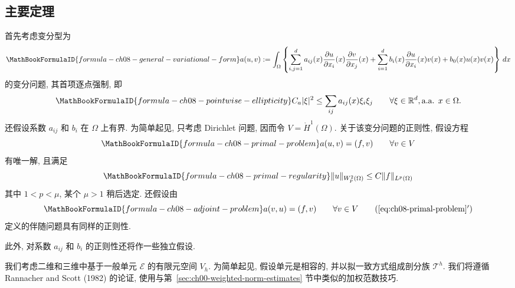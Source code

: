 \subsection{主要定理}
\label{sec:ch08-main-theorem}
\setcounter{thmcount}{0}
\setcounter{equation}{0}

首先考虑变分型为
\[
\MathBookFormulaID{formula-ch08-general-variational-form}
a(u,v):=\int_\Omega\left\{\sum_{i,j=1}^{d}a_{ij}(x)
\frac{\partial u}{\partial x_i}(x)\frac{\partial v}{\partial x_j}(x)
+\sum_{i=1}^{d}b_i(x)\frac{\partial u}{\partial x_i}(x)v(x)+b_0(x)u(x)v(x)\right\}\,dx
\]
的变分问题, 其首项逐点强制, 即
\begin{equation}
\MathBookFormulaID{formula-ch08-pointwise-ellipticity}
\label{eq:ch08-pointwise-ellipticity}
C_a|\xi|^2\leq\sum_{ij}a_{ij}(x)\xi_i\xi_j
\qquad\forall\xi\in\mathbb R^d, \text{a.a. }x\in\Omega.
\end{equation}
还假设系数 $a_{ij}$ 和 $b_i$ 在 $\Omega$ 上有界. 为简单起见, 只考虑 Dirichlet 问题, 因而令 $V=\mathring H^1(\Omega)$. 关于该变分问题的正则性, 假设方程
\begin{equation}
\MathBookFormulaID{formula-ch08-primal-problem}
\label{eq:ch08-primal-problem}
a(u,v)=(f,v)
\qquad\forall v\in V
\end{equation}
有唯一解, 且满足
\begin{equation}
\MathBookFormulaID{formula-ch08-primal-regularity}
\label{eq:ch08-primal-regularity}
\|u\|_{W_p^2(\Omega)}\leq C\|f\|_{L^p(\Omega)}
\end{equation}
其中 $1<p<\mu$, 某个 $\mu>1$ 稍后选定. 还假设由
\begin{equation}
\MathBookFormulaID{formula-ch08-adjoint-problem}
\label{eq:ch08-adjoint-problem}
a(v,u)=(f,v)
\qquad\forall v\in V
\tag{\ref*{eq:ch08-primal-problem}$'$}
\end{equation}
定义的伴随问题具有同样的正则性.

此外, 对系数 $a_{ij}$ 和 $b_i$ 的正则性还将作一些独立假设.

我们考虑二维和三维中基于一般单元 $\mathcal E$ 的有限元空间 $V_h$. 为简单起见, 假设单元是相容的, 并以拟一致方式组成剖分族 $\mathcal T^h$. 我们将遵循 Rannacher and Scott (1982) 的论证, 使用与第~\ref{sec:ch00-weighted-norm-estimates} 节中类似的加权范数技巧.

